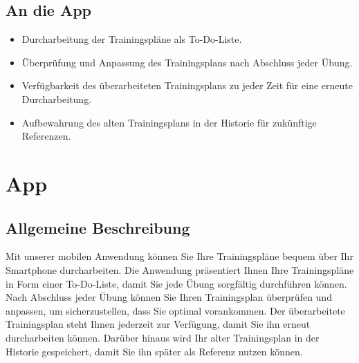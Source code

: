 \subsection{An die App}
\begin{itemize}
    \item Durcharbeitung der Trainingspläne als To-Do-Liste.
    \item Überprüfung und Anpassung des Trainingsplans nach Abschluss jeder Übung.
    \item Verfügbarkeit des überarbeiteten Trainingsplans zu jeder Zeit für eine erneute Durcharbeitung.
    \item Aufbewahrung des alten Trainingsplans in der Historie für zukünftige Referenzen.
\end{itemize}

\section{App}


\subsection{Allgemeine Beschreibung}
Mit unserer mobilen Anwendung können Sie Ihre Trainingspläne bequem über Ihr 
Smartphone durcharbeiten. Die Anwendung präsentiert Ihnen Ihre Trainingspläne 
in Form einer To-Do-Liste, damit Sie jede Übung sorgfältig durchführen können. 
Nach Abschluss jeder Übung können Sie Ihren Trainingsplan überprüfen und anpassen, 
um sicherzustellen, dass Sie optimal vorankommen. Der überarbeitete Trainingsplan 
steht Ihnen jederzeit zur Verfügung, damit Sie ihn erneut durcharbeiten können. 
Darüber hinaus wird Ihr alter Trainingsplan in der Historie gespeichert, damit Sie 
ihn später als Referenz nutzen können.



